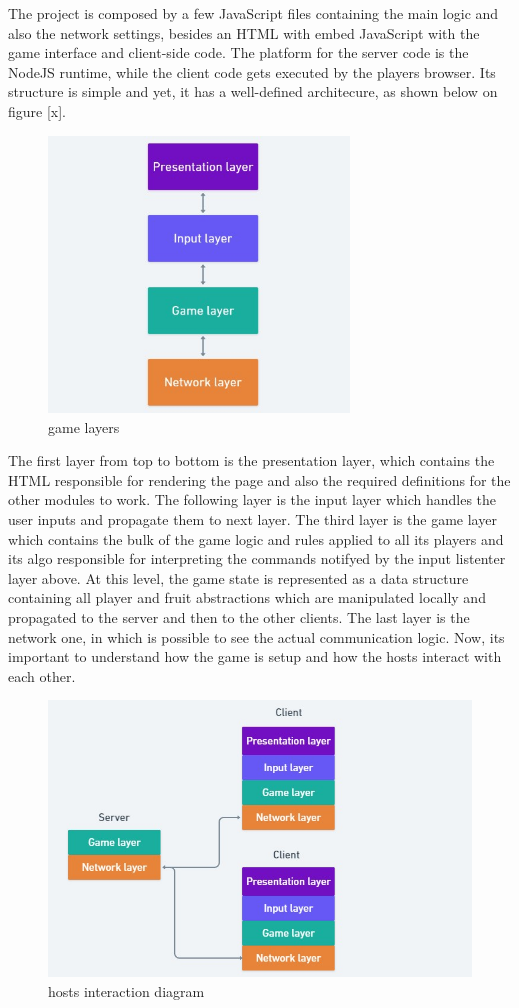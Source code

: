 \documentclass[english]{sbrt}
\begin{document}
The project is composed by a few JavaScript files containing the main logic and also the network settings, besides an HTML with embed JavaScript with the game interface and client-side code. The platform for the server code is the NodeJS runtime, while the client code gets executed by the players browser. Its structure is simple and yet, it has a well-defined architecure, as shown below on figure [x].

\begin{figure}[H]
  \centering
  \includegraphics[width=8cm]{game-layers.jpg}
  \caption{game layers}
\end{figure}

The first layer from top to bottom is the presentation layer, which contains the HTML responsible for rendering the page and also the required definitions for the other modules to work.
The following layer is the input layer which handles the user inputs and propagate them to next layer. The third layer is the game layer which contains the bulk of the game logic and rules
applied to all its players and its algo responsible for interpreting the commands notifyed by the input listenter layer above. At this level, the game state is represented as a data structure containing
all player and fruit abstractions which are manipulated locally and propagated to the server and then to the other clients. The last layer is the network one, in which is possible to see the actual communication logic.
Now, its important to understand how the game is setup and how the hosts interact with each other.

\begin{figure}[H]
  \centering
  \includegraphics[width=12cm]{game-diagram.jpg}
  \caption{hosts interaction diagram}
\end{figure}
\end{document}
